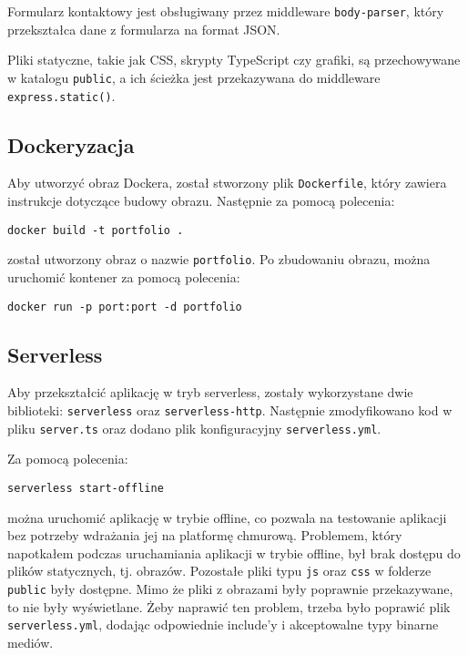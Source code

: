 \documentclass[a4paper,12pt]{article}
\begin{document}
Formularz kontaktowy jest obsługiwany przez middleware \texttt{body-parser}, który przekształca dane z formularza na format JSON.

Pliki statyczne, takie jak CSS, skrypty TypeScript czy grafiki, są przechowywane w katalogu \texttt{public}, a ich ścieżka jest przekazywana do middleware \texttt{express.static()}.

\subsection{Dockeryzacja}
Aby utworzyć obraz Dockera, został stworzony plik \texttt{Dockerfile}, który zawiera instrukcje dotyczące budowy obrazu. Następnie za pomocą polecenia:
\begin{lstlisting}
docker build -t portfolio .
\end{lstlisting}
został utworzony obraz o nazwie \texttt{portfolio}. Po zbudowaniu obrazu, można uruchomić kontener za pomocą polecenia:
\begin{lstlisting}
docker run -p port:port -d portfolio
\end{lstlisting}

\subsection{Serverless}
Aby przekształcić aplikację w tryb serverless, zostały wykorzystane dwie biblioteki: \texttt{serverless} oraz \texttt{serverless-http}. Następnie zmodyfikowano kod w pliku \texttt{server.ts} oraz dodano plik konfiguracyjny \texttt{serverless.yml}.

Za pomocą polecenia:
\begin{lstlisting}
serverless start-offline
\end{lstlisting}
można uruchomić aplikację w trybie offline, co pozwala na testowanie aplikacji bez potrzeby wdrażania jej na platformę chmurową. Problemem, który napotkałem podczas uruchamiania aplikacji w trybie offline, był brak dostępu do plików statycznych, tj. obrazów. Pozostałe pliki typu \texttt{js} oraz \texttt{css} w folderze \texttt{public} były dostępne. Mimo że pliki z obrazami były poprawnie przekazywane, to nie były wyświetlane. Żeby naprawić ten problem, trzeba było poprawić plik \texttt{serverless.yml}, dodając odpowiednie include'y i akceptowalne typy binarne mediów.
\end{document}
